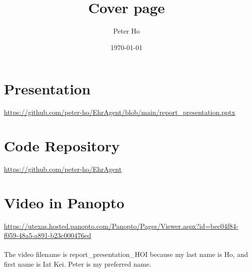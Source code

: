 \documentclass{article}
\author{Peter Ho}
\title{Cover page}
\date{\today}
\begin{document}
\maketitle
\section{Presentation}
\url{https://github.com/peter-ho/EhrAgent/blob/main/report_presentation.pptx}
\\

\section{Code Repository}
\url{https://github.com/peter-ho/EhrAgent}

\section{Video in Panopto}
\url{https://utexas.hosted.panopto.com/Panopto/Pages/Viewer.aspx?id=bec04f84-f059-48a5-a891-b23c000476ed}
\\
\\
The video filename is report\_presentation\_HOI because my last name is Ho, and first name is Iat Kei. Peter is my preferred name. 
\end{document}
